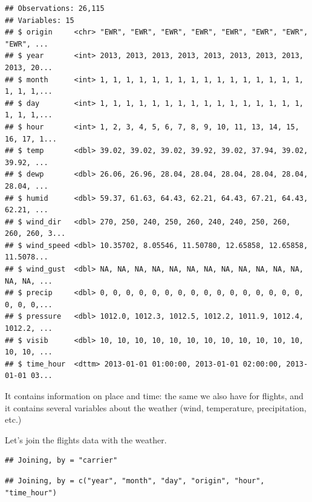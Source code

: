 \documentclass[]{tufte-book}
\newenvironment{Shaded}{}{}
\newcommand{\KeywordTok}[1]{\textcolor[rgb]{0.00,0.44,0.13}{\textbf{#1}}}
\newcommand{\NormalTok}[1]{#1}
\newcommand{\OperatorTok}[1]{\textcolor[rgb]{0.40,0.40,0.40}{#1}}
\newcommand{\StringTok}[1]{\textcolor[rgb]{0.25,0.44,0.63}{#1}}
\begin{document}
\begin{verbatim}
## Observations: 26,115
## Variables: 15
## $ origin     <chr> "EWR", "EWR", "EWR", "EWR", "EWR", "EWR", "EWR", "EWR", ...
## $ year       <int> 2013, 2013, 2013, 2013, 2013, 2013, 2013, 2013, 2013, 20...
## $ month      <int> 1, 1, 1, 1, 1, 1, 1, 1, 1, 1, 1, 1, 1, 1, 1, 1, 1, 1, 1,...
## $ day        <int> 1, 1, 1, 1, 1, 1, 1, 1, 1, 1, 1, 1, 1, 1, 1, 1, 1, 1, 1,...
## $ hour       <int> 1, 2, 3, 4, 5, 6, 7, 8, 9, 10, 11, 13, 14, 15, 16, 17, 1...
## $ temp       <dbl> 39.02, 39.02, 39.02, 39.92, 39.02, 37.94, 39.02, 39.92, ...
## $ dewp       <dbl> 26.06, 26.96, 28.04, 28.04, 28.04, 28.04, 28.04, 28.04, ...
## $ humid      <dbl> 59.37, 61.63, 64.43, 62.21, 64.43, 67.21, 64.43, 62.21, ...
## $ wind_dir   <dbl> 270, 250, 240, 250, 260, 240, 240, 250, 260, 260, 260, 3...
## $ wind_speed <dbl> 10.35702, 8.05546, 11.50780, 12.65858, 12.65858, 11.5078...
## $ wind_gust  <dbl> NA, NA, NA, NA, NA, NA, NA, NA, NA, NA, NA, NA, NA, NA, ...
## $ precip     <dbl> 0, 0, 0, 0, 0, 0, 0, 0, 0, 0, 0, 0, 0, 0, 0, 0, 0, 0, 0,...
## $ pressure   <dbl> 1012.0, 1012.3, 1012.5, 1012.2, 1011.9, 1012.4, 1012.2, ...
## $ visib      <dbl> 10, 10, 10, 10, 10, 10, 10, 10, 10, 10, 10, 10, 10, 10, ...
## $ time_hour  <dttm> 2013-01-01 01:00:00, 2013-01-01 02:00:00, 2013-01-01 03...
\end{verbatim}

It contains information on place and time: the same we also have for flights, and it contains several variables about the weather (wind, temperature, precipitation, etc.)

Let's join the flights data with the weather.

\begin{Shaded}
\end{Shaded}

\begin{verbatim}
## Joining, by = "carrier"
\end{verbatim}

\begin{verbatim}
## Joining, by = c("year", "month", "day", "origin", "hour", "time_hour")
\end{verbatim}
\end{document}
